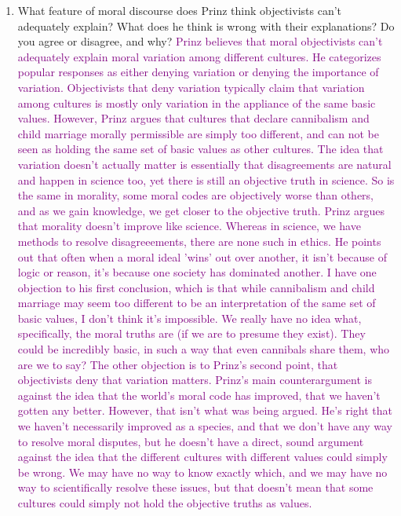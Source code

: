 \documentclass[12pt]{article}
\newcommand{\ans}[1]{\textcolor{purple}{#1}}
\begin{document}
\begin{enumerate}
    \item What feature of moral discourse does Prinz think objectivists can’t adequately explain? What does he think is wrong with their explanations? Do you agree or disagree, and why? \ans{Prinz believes that moral objectivists can't adequately explain moral variation among different cultures. He categorizes popular responses as either denying variation or denying the importance of variation. Objectivists that deny variation typically claim that variation among cultures is mostly only variation in the appliance of the same basic values. However, Prinz argues that cultures that declare cannibalism and child marriage morally permissible are simply too different, and can not be seen as holding the same set of basic values as other cultures. The idea that variation doesn't actually matter is essentially that disagreements are natural and happen in science too, yet there is still an objective truth in science. So is the same in morality, some moral codes are objectively worse than others, and as we gain knowledge, we get closer to the objective truth. Prinz argues that morality doesn't improve like science. Whereas in science, we have methods to resolve disagreeements, there are none such in ethics. He points out that often when a moral ideal 'wins' out over another, it isn't because of logic or reason, it's because one society has dominated another. I have one objection to his first conclusion, which is that while cannibalism and child marriage may seem too different to be an interpretation of the same set of basic values, I don't think it's impossible. We really have no idea what, specifically, the moral truths are (if we are to presume they exist). They could be incredibly basic, in such a way that even cannibals share them, who are we to say? The other objection is to Prinz's second point, that objectivists deny that variation matters. Prinz's main counterargument is against the idea that the world's moral code has improved, that we haven't gotten any better. However, that isn't what was being argued. He's right that we haven't necessarily improved as a species, and that we don't have any way to resolve moral disputes, but he doesn't have a direct, sound argument against the idea that the different cultures with different values could simply be wrong. We may have no way to know exactly which, and we may have no way to scientifically resolve these issues, but that doesn't mean that some cultures could simply not hold the objective truths as values.
    }


\end{enumerate}
\end{document}
